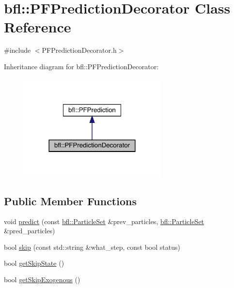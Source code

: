 \hypertarget{classbfl_1_1PFPredictionDecorator}{}\section{bfl\+:\+:P\+F\+Prediction\+Decorator Class Reference}
\label{classbfl_1_1PFPredictionDecorator}


{\ttfamily \#include $<$P\+F\+Prediction\+Decorator.\+h$>$}



Inheritance diagram for bfl\+:\+:P\+F\+Prediction\+Decorator\+:
\nopagebreak
\begin{figure}[H]
\begin{center}
\leavevmode
\includegraphics[width=213pt]{classbfl_1_1PFPredictionDecorator__inherit__graph}
\end{center}
\end{figure}
\subsection*{Public Member Functions}
\begin{DoxyCompactItemize}
\item 
void \mbox{\hyperlink{classbfl_1_1PFPrediction_a129dcd1cccd2da9827ef0c49c90b9345}{predict}} (const \mbox{\hyperlink{classbfl_1_1ParticleSet}{bfl\+::\+Particle\+Set}} \&prev\+\_\+particles, \mbox{\hyperlink{classbfl_1_1ParticleSet}{bfl\+::\+Particle\+Set}} \&pred\+\_\+particles)
\item 
bool \mbox{\hyperlink{classbfl_1_1PFPrediction_a364cc35a151e5298c4024d681f3e04d9}{skip}} (const std\+::string \&what\+\_\+step, const bool status)
\item 
bool \mbox{\hyperlink{classbfl_1_1PFPrediction_a323ca5612dd7ad924fd448a629359ad2}{get\+Skip\+State}} ()
\item 
bool \mbox{\hyperlink{classbfl_1_1PFPrediction_a432b8e84dbf00432158aa82312386d63}{get\+Skip\+Exogenous}} ()
\end{DoxyCompactItemize}
